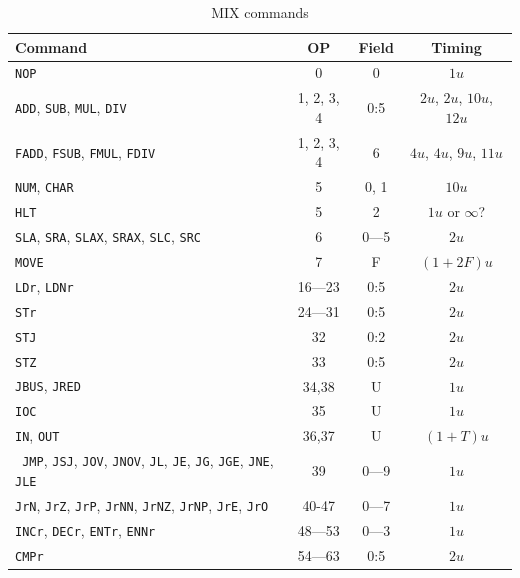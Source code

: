 \documentclass[a4paper,ngerman]{scrartcl}
\begin{document}
\begin{table}
	\centering
	\label{tab:commands}
\caption{	MIX commands}
\begin{tabular}{|l|c|c|c|}

	\hline 
	\textbf{Command} & \textbf{OP} & \textbf{Field} & \textbf{Timing} \\ 
	\hline 
 \lstinline|NOP|     & 0   & 0     & $1u$     \\
	\hline 
 \lstinline|ADD|, \lstinline|SUB|, \lstinline|MUL|, \lstinline|DIV|     & 1, 2, 3, 4   & 0:5   & $2u$, $2u$, $10u$, $12u$     \\
 	\hline 
 \lstinline|FADD|, \lstinline|FSUB|, \lstinline|FMUL|, \lstinline|FDIV|   & 1, 2, 3, 4   & 6     & $4u$, $4u$, $9u$, $11u$     \\
 	\hline 
 \lstinline|NUM|, \lstinline|CHAR|& 5   & 0, 1   & $10u$    \\
 	\hline 
 \lstinline|HLT|     & 5   & 2     & $1u$ or $\infty$?   \\
 	\hline 
 \lstinline|SLA|, \lstinline|SRA|, \lstinline|SLAX|, \lstinline|SRAX|, \lstinline|SLC|, \lstinline|SRC|& 6  & 0---5&  $2u$     \\
 	\hline 
 \lstinline|MOVE|    & 7   & F     & $(1+2F)u$\\
 	\hline 
 \lstinline|LDr|, \lstinline|LDNr|    &16---23&0:5   & $2u$     \\
 	\hline 
 \lstinline|STr|     &24---31& 0:5   & $2u$     \\
 	\hline 
 \lstinline|STJ|     & 32  & 0:2   & $2u$     \\
 	\hline 
 \lstinline|STZ|     & 33  & 0:5   & $2u$     \\
	\hline 
\lstinline|JBUS|, \lstinline|JRED|&34,38& U     & $1u$     \\
	\hline 
 \lstinline|IOC|     & 35  & U     & $1u$     \\
	\hline 
 \lstinline|IN|, \lstinline|OUT|  &36,37& U     & $(1+T)u$ \\
	\hline 
\lstinline| JMP|, \lstinline|JSJ|, \lstinline|JOV|, \lstinline|JNOV|, \lstinline|JL|, \lstinline|JE|, \lstinline|JG|, \lstinline|JGE|, \lstinline|JNE|, \lstinline|JLE|& 39  &0---9  & $1u$   \\
 	\hline 
 \lstinline|JrN|, \lstinline|JrZ|, \lstinline|JrP|, \lstinline|JrNN|, \lstinline|JrNZ|, \lstinline|JrNP|, \lstinline|JrE|, \lstinline|JrO| & 40-47& 0---7 & 	$1u$ \\
	\hline 
 \lstinline|INCr|, \lstinline|DECr|, \lstinline|ENTr|, \lstinline|ENNr|  & 48---53   &0---3     & $1u$   \\
	\hline 
 \lstinline|CMPr| & 54---63&0:5          & $2u$   \\
	\hline 
\end{tabular} 
\end{table}
\end{document}
